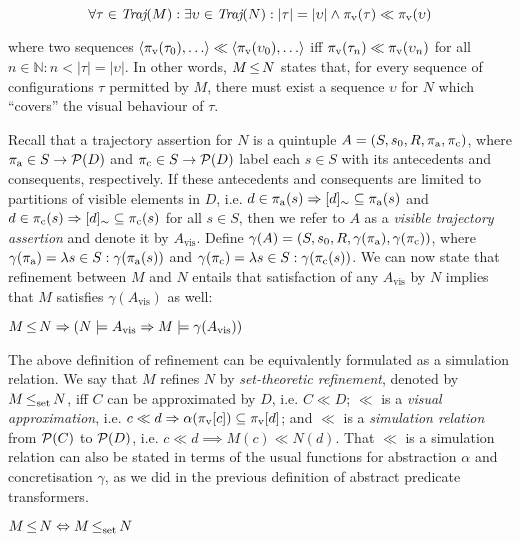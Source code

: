 \begin{equation*}
\forall \tau \in \operatorname{\textit{Traj}}(M) : \exists \upsilon \in \operatorname{\textit{Traj}}(N) : | \tau | = | \upsilon | \wedge \pi_{\textrm{v}}(\tau) \ll \pi_{\textrm{v}}(\upsilon)
\end{equation*}

\noindent where two sequences $\langle \pi_{\textrm{v}}(\tau_{0}), \ldots \rangle \ll \langle \pi_{\textrm{v}}(\upsilon_{0}), \ldots \rangle$ iff $\pi_{\textrm{v}}(\tau_{n}) \ll \pi_{\textrm{v}}(\upsilon_{n})$ for all $n \in \mathbb{N} : n < | \tau | = | \upsilon |$. In other words, $M \operatorname{\leq} N$ states that, for every sequence of configurations $\tau$ permitted by $M$, there must exist a sequence $\upsilon$ for $N$ which ``covers'' the visual behaviour of $\tau$.

Recall that a trajectory assertion for $N$ is a quintuple $A = (S, s_{0}, R, \operatorname{\pi_{\textrm{a}}}, \operatorname{\pi_{\textrm{c}}})$, where $\operatorname{\pi_{\textrm{a}}} \in S \rightarrow \mathcal{P}(D)$ and $\operatorname{\pi_{\textrm{c}}} \in S \rightarrow \mathcal{P}(D)$ label each $s \in S$ with its antecedents and consequents, respectively. If these antecedents and consequents are limited to partitions of visible elements in $D$, i.e. $d \in \operatorname{\pi_{\textrm{a}}}(s) \Rightarrow [d]_{\sim} \subseteq \operatorname{\pi_{\textrm{a}}}(s)$ and $d \in \operatorname{\pi_{\textrm{c}}}(s) \Rightarrow [d]_{\sim} \subseteq \operatorname{\pi_{\textrm{c}}}(s)$ for all $s \in S$, then we refer to $A$ as a \textit{visible trajectory assertion} and denote it by $A_{\textrm{vis}}$. Define $\gamma(A) = (S, s_{0}, R, \gamma(\operatorname{\pi_{\textrm{a}}}), \gamma(\operatorname{\pi_{\textrm{c}}}))$, where $\gamma(\operatorname{\pi_{\textrm{a}}}) = \lambda s \in S : \gamma(\operatorname{\pi_{\textrm{a}}}(s))$ and $\gamma(\operatorname{\pi_{\textrm{c}}}) = \lambda s \in S : \gamma(\operatorname{\pi_{\textrm{c}}}(s))$. We can now state that refinement between $M$ and $N$ entails that satisfaction of any $A_{\textrm{vis}}$ by $N$ implies that $M$ satisfies $\gamma(A_{\textrm{vis}})$ as well:

\begin{theorem} \label{thm:traj-refines}
$M \operatorname{\leq} N \Rightarrow (N \models A_{\textrm{vis}} \Rightarrow M \models \gamma(A_{\textrm{vis}}))$
\end{theorem}

The above definition of refinement can be equivalently formulated as a simulation relation. We say that $M$ refines $N$ by \textit{set-theoretic refinement}, denoted by $M \operatorname{\operatorname{\leq}_{\textrm{set}}} N$, iff $C$ can be approximated by $D$, i.e. $C \ll D$; $\ll$ is a \textit{visual approximation}, i.e. $c \ll d \Rightarrow \alpha(\pi_{\textrm{v}}[c]) \subseteq \pi_{\textrm{v}}[d]$; and $\ll$ is a \textit{simulation relation} from $\mathcal{P}(C)$ to $\mathcal{P}(D)$, i.e. $c \ll d \implies M(c) \ll N(d)$. That $\ll$ is a simulation relation can also be stated in terms of the usual functions for abstraction $\alpha$ and concretisation $\gamma$, as we did in the previous definition of abstract predicate transformers.

\begin{theorem} \label{thm:traj-equal-set}
$M \operatorname{\leq} N \Leftrightarrow M \operatorname{\operatorname{\leq}_{\textrm{set}}} N$
\end{theorem}
